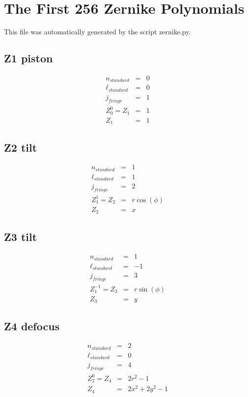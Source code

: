 \documentclass[10pt]{article}
\begin{document}
\section{The First 256 Zernike Polynomials}
This file was automatically generated by the script zernike.py.
  \subsection{Z1 piston}
    \begin{subequations}
    \begin{eqnarray}
        n_{standard} &=&0\\
        \ell_{standard} &=&0\\
        j_{fringe} &=&1\\
        Z_{0}^{0} = Z_{1} &=& 1\\
        Z_{1} &=& 1
    \end{eqnarray}
    \end{subequations}
  \subsection{Z2 tilt}
    \begin{subequations}
    \begin{eqnarray}
        n_{standard} &=&1\\
        \ell_{standard} &=&1\\
        j_{fringe} &=&2\\
        Z_{1}^{1} = Z_{2} &=& r \cos{\left(\phi \right)}\\
        Z_{2} &=& x
    \end{eqnarray}
    \end{subequations}
  \subsection{Z3 tilt}
    \begin{subequations}
    \begin{eqnarray}
        n_{standard} &=&1\\
        \ell_{standard} &=&-1\\
        j_{fringe} &=&3\\
        Z_{1}^{-1} = Z_{3} &=& r \sin{\left(\phi \right)}\\
        Z_{3} &=& y
    \end{eqnarray}
    \end{subequations}
  \subsection{Z4 defocus}
    \begin{subequations}
    \begin{eqnarray}
        n_{standard} &=&2\\
        \ell_{standard} &=&0\\
        j_{fringe} &=&4\\
        Z_{2}^{0} = Z_{4} &=& 2 r^{2} - 1\\
        Z_{4} &=& 2 x^{2} + 2 y^{2} - 1
    \end{eqnarray}
    \end{subequations}
\end{document}
